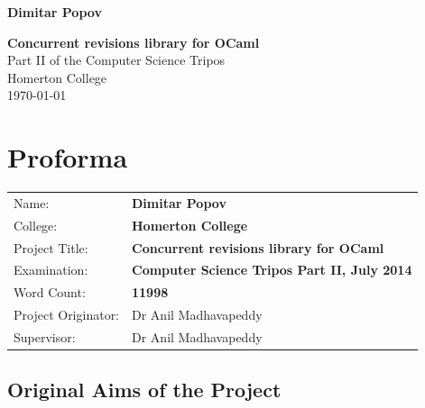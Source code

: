 \documentclass[12pt,twoside,notitlepage]{report}
\begin{document}





\pagestyle{empty}

\hfill{\LARGE \bf Dimitar Popov}

\vspace*{60mm}
\begin{center}
\Huge
{\bf Concurrent revisions library for OCaml} \\
\vspace*{5mm}
Part II of the Computer
Science Tripos\\
\vspace*{5mm}
Homerton College \\
\vspace*{5mm}
\today  %
\end{center}

\cleardoublepage


\setcounter{page}{1}
\pagestyle{plain}

\chapter*{Proforma}

{\large
\begin{tabular}{ll} 
Name:               & \bf Dimitar Popov                     \\
College:            & \bf Homerton College                     \\
Project Title:      & \bf Concurrent revisions library for OCaml \\
Examination:        & \bf Computer Science Tripos Part II, July 2014        \\
Word Count:         & \bf 11998\footnotemark[1]
\\
Project Originator: & Dr Anil Madhavapeddy                    \\
Supervisor:         & Dr Anil Madhavapeddy                    \\ 
\end{tabular} 
}


\section*{Original Aims of the Project}
\end{document}
